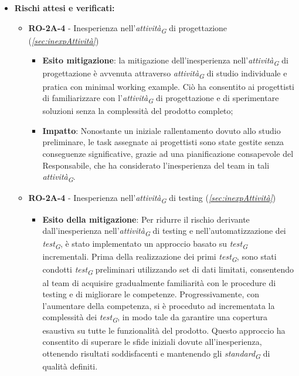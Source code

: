\begin{itemize}
    \item \textbf{Rischi attesi e verificati:}
\begin{itemize}
    \item \textbf{RO-2A-4} - Inesperienza nell'\textit{attività}\textsubscript{\textit{G}} di progettazione (\textit{\ref{sec:inexpAttività}})
        \begin{itemize}
            \item \textbf{Esito mitigazione}: 
            la mitigazione dell'inesperienza nell'\textit{attività}\textsubscript{\textit{G}} di progettazione è avvenuta attraverso \textit{attività}\textsubscript{\textit{G}} di studio individuale e pratica con minimal working example. Ciò ha consentito ai progettisti di familiarizzare con l'\textit{attività}\textsubscript{\textit{G}} di progettazione e di sperimentare soluzioni senza la complessità del prodotto completo;
            \item \textbf{Impatto}: Nonostante un iniziale rallentamento dovuto allo studio preliminare, le task assegnate ai progettisti sono state gestite senza conseguenze significative, grazie ad una pianificazione consapevole del Responsabile, che ha considerato l'inesperienza del team in tali \textit{attività}\textsubscript{\textit{G}}.
        \end{itemize}
    \item \textbf{RO-2A-4} - Inesperienza nell'\textit{attività}\textsubscript{\textit{G}} di testing (\textit{\ref{sec:inexpAttività}})
        \begin{itemize}
            \item \textbf{Esito della mitigazione}: Per ridurre il rischio derivante dall'inesperienza nell'\textit{attività}\textsubscript{\textit{G}} di testing e nell'automatizzazione dei \textit{test}\textsubscript{\textit{G}}, è stato implementato un approccio basato su \textit{test}\textsubscript{\textit{G}} incrementali. Prima della realizzazione dei primi \textit{test}\textsubscript{\textit{G}}, sono stati condotti \textit{test}\textsubscript{\textit{G}} preliminari utilizzando set di dati limitati, consentendo al team di acquisire gradualmente familiarità con le procedure di testing e di migliorare le competenze. Progressivamente, con l'aumentare della competenza, si è proceduto ad incrementata la complessità dei \textit{test}\textsubscript{\textit{G}}, in modo tale da garantire una copertura esaustiva su tutte le funzionalità del prodotto. Questo approccio ha consentito di superare le sfide iniziali dovute all'inesperienza, ottenendo risultati soddisfacenti e mantenendo gli \textit{standard}\textsubscript{\textit{G}} di qualità definiti.

\end{itemize}
\end{itemize}
\end{itemize}

